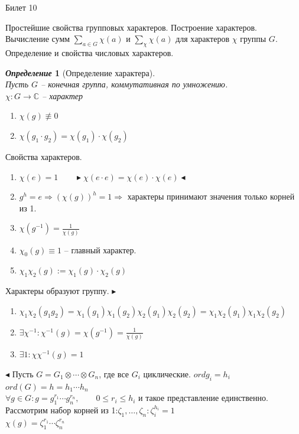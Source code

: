\documentclass[a4paper,12pt]{article}
\newtheorem{deff}{\textit{Определение}}
\newcommand{\ee}{\equiv}
\newcommand{\q}{\quad}
\newcommand{\pb}{\blacktriangleright}
\newcommand{\pe}{\blacktriangleleft}
\newcommand{\Ra}{\Rightarrow}
\newcommand{\bb}[1]{\mathbb{#1}}
\begin{document}
\newpage
\begin{mybox2}{\hypertarget{bil10}{Билет 10}}

\begin{formbox}{}
Простейшие свойства групповых характеров. Построение характеров. Вычисление сумм $\sum_{a\in G} \chi(a)$ и $\sum_\chi \chi(a)$ для характеров $\chi$ группы $G$. Определение и свойства числовых характеров.
\end{formbox}
\begin{formbox}{}
\begin{deff} [Определение характера]\q\\
Пусть $G$ -- конечная группа, коммутативная по умножению.\\
$\chi:G\to\bb{C}$ -- характер
\begin{enumerate}
\item $\chi(g) \not\ee0 $
\item $\chi(g_1 \cdot g_2) = \chi(g_1)\cdot \chi(g_2)  $
\end{enumerate}
\end{deff}
\end{formbox}
Свойства характеров.
\begin{enumerate}
\item $\chi(e) = 1\q\q \pb \chi(e\cdot e) = \chi(e)\cdot \chi(e) \pe$
\item $g^h=e\Ra (\chi(g))^h = 1 \Ra $ характеры принимают значения только корней из 1.
\item $\chi(g^{-1}) = \frac{1}{\chi(g)}$
\item $\chi_0(g)\ee 1$ -- главный характер.
\item $\chi_1 \chi_2 (g):= \chi_1(g)\cdot\chi_2(g)$
\end{enumerate}
Характеры образуют группу.
$\pb$
\begin{enumerate}
\item $\chi_1\chi_2 (g_1 g_2) = \chi_1(g_1)\chi_1(g_2)\chi_2(g_1)\chi_2(g_2) = \chi_1\chi_2(g_1)\chi_1\chi_2(g_2)$
\item $\exists \chi^{-1}: \chi^{-1}(g) =\chi(g^{-1}) = \frac{1}{\chi(g)}$
\item $\exists 1: \chi\chi^{-1}(g) = 1$
\end{enumerate} $\pe$
Пусть $G = G_1\otimes \cdots \otimes G_n$, где все $G_i$ циклические. $ord g_i = h_i$\\
$ord (G) = h = h_1\cdots h_n$\\
$\forall g\in G: g = g_1^{r_1}\cdots g_n^{r_n},\q\q 0\le r_i\le h_i$ и такое представление единственно.\\
Рассмотрим набор корней из 1:$\zeta_1,\dots,\zeta_n: \zeta_i^{h_i} = 1$\\
$\chi(g) = \zeta_1^{r_1}\cdots \zeta_n^{r_n}$


\end{mybox2}
\end{document}
